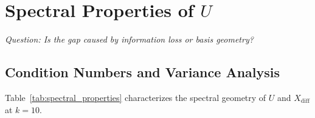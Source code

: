 \documentclass[11pt]{article}
\begin{document}
\section{Spectral Properties of $U$}
\textit{Question: Is the gap caused by information loss or basis geometry?}
\label{sec:spectral}

\subsection{Condition Numbers and Variance Analysis}

Table~\ref{tab:spectral_properties} characterizes the spectral geometry of $U$ and
$X_{\text{diff}}$ at $k{=}10$.

\end{document}
